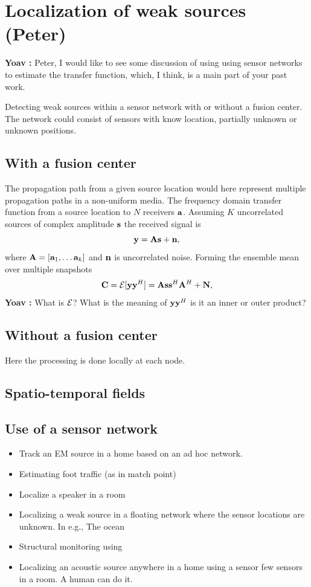 \documentclass{article}
\newcommand{\comment}[3]{{\color{#1} {\bf #2 :} #3}}
\newcommand{\yoav}[1]{\comment{magenta}{Yoav}{#1}}
\begin{document}
\section{Localization of weak sources (Peter)}

\yoav{Peter, I would like to see some discussion of using using sensor
  networks to estimate the transfer function, which, I think, is a
  main part of your past work.}

Detecting weak sources within a sensor network with or without a fusion center. The network could consist of sensors with know location, partially unknown or unknown positions.


\subsection{With a fusion center}
The propagation path from a given source location would here represent multiple propagation paths in a non-uniform media. The frequency domain transfer function from a source location to $N$ receivers ${\bf a}$. Assuming $K$ uncorrelated sources of complex amplitude $\bf s$ the received signal is 
\begin{equation}
{\bf y}={\bf A}{\bf s}+{\bf n},
\end{equation}
where ${\bf A}=[{\bf a}_1, \dots {\bf a}_k ]$  and $\bf n$ is uncorrelated noise. 
Forming the ensemble mean over multiple snapshots 
\begin{equation}
{\bf C}={\cal E}[{\bf y} {\bf y}^H]= {\bf A}{\bf s}{\bf s}^H{\bf A}^H+{\bf N},
\end{equation}
\yoav{What is ${\cal E}$?  What is the meaning of ${\bf y} {\bf y}^H$
  is it an inner or outer product? }

\subsection{Without a fusion center}
Here the processing is done locally at each node.

\subsection{Spatio-temporal fields}

\subsection{Use of a sensor network}
\begin{itemize}
\item Track an EM source in a home based on an ad hoc network. 
\item Estimating foot traffic (as in match point)
\item Localize a speaker in a room
\item Localizing a weak source in a floating network where the sensor locations are unknown. In e.g., The ocean
\item Structural monitoring using 
\item Localizing an acoustic source anywhere in a home using a sensor few sensors in a room. A human can do it. 
\end{itemize}
\end{document}
